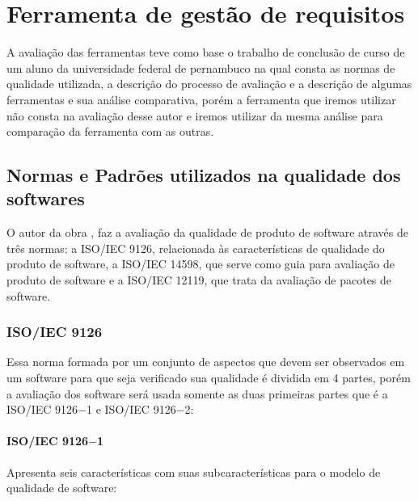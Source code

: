 \chapter{Ferramenta de gestão de requisitos}

  A avaliação das ferramentas teve como base o trabalho de conclusão de curso de um aluno da universidade federal de pernambuco
  na qual consta as normas de qualidade utilizada, a descrição do processo de avaliação e a descrição de algumas ferramentas e sua
  análise comparativa, porém a ferramenta que iremos utilizar não consta na avaliação desse autor e iremos utilizar da mesma análise
  para comparação da ferramenta com as outras.

\section{Normas e Padrões utilizados na qualidade dos softwares}

  O autor da obra \cite{rafael2009}, faz a avaliação da qualidade de produto de software através de três normas: a ISO/IEC 9126,
  relacionada às características de qualidade do produto de software, a ISO/IEC 14598, que serve como guia para avaliação de
  produto de software e a ISO/IEC 12119, que trata da avaliação de pacotes de software.

\subsection{ISO/IEC 9126}

  Essa norma formada por um conjunto de aspectos que devem ser observados em um software para que seja verificado sua qualidade é
  dividida em 4 partes, porém a avaliação dos software será usada somente as duas primeiras partes que é a ISO/IEC 9126$-$1 e
  ISO/IEC 9126$-$2:

\subsubsection{ISO/IEC 9126$-$1}

  Apresenta seis características com suas subcaracterísticas para o modelo de qualidade de software:

